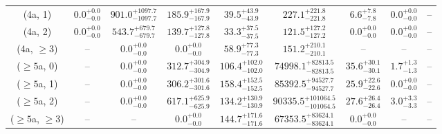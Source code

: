 \begin{table}[h!]
{\begin{tabular}{ccccccccc}
	(4a, 1) & $0.0^{+ 0.0 }_{- 0.0 }$ & $901.0^{+ 1097.7 }_{- 1097.7 }$ & $185.9^{+ 167.9 }_{- 167.9 }$ & $39.5^{+ 43.9 }_{- 43.9 }$ & $227.1^{+ 221.8 }_{- 221.8 }$ & $6.6^{+ 7.8 }_{- 7.8 }$ & $0.0^{+ 0.0 }_{- 0.0 }$ & -- \\[0.5ex] 
	(4a, 2) & $0.0^{+ 0.0 }_{- 0.0 }$ & $543.7^{+ 679.7 }_{- 679.7 }$ & $139.7^{+ 127.8 }_{- 127.8 }$ & $33.3^{+ 37.5 }_{- 37.5 }$ & $121.5^{+ 127.2 }_{- 127.2 }$ & $0.0^{+ 0.0 }_{- 0.0 }$ & $0.0^{+ 0.0 }_{- 0.0 }$ & -- \\[0.5ex] 
	(4a, $\ge3$) & -- & $0.0^{+ 0.0 }_{- 0.0 }$ & $0.0^{+ 0.0 }_{- 0.0 }$ & $58.9^{+ 77.3 }_{- 77.3 }$ & $151.2^{+ 210.1 }_{- 210.1 }$ & -- & -- & -- \\[0.5ex] 
	($\ge5$a, 0) & -- & $0.0^{+ 0.0 }_{- 0.0 }$ & $312.7^{+ 304.9 }_{- 304.9 }$ & $106.4^{+ 102.0 }_{- 102.0 }$ & $74998.1^{+ 82813.5 }_{- 82813.5 }$ & $35.6^{+ 30.1 }_{- 30.1 }$ & $1.7^{+ 1.3 }_{- 1.3 }$ & -- \\[0.5ex] 
	($\ge5$a, 1) & -- & $0.0^{+ 0.0 }_{- 0.0 }$ & $306.2^{+ 301.6 }_{- 301.6 }$ & $158.4^{+ 152.5 }_{- 152.5 }$ & $85392.5^{+ 94527.7 }_{- 94527.7 }$ & $25.9^{+ 22.6 }_{- 22.6 }$ & $0.0^{+ 0.0 }_{- 0.0 }$ & -- \\[0.5ex] 
	($\ge5$a, 2) & -- & $0.0^{+ 0.0 }_{- 0.0 }$ & $617.1^{+ 625.9 }_{- 625.9 }$ & $134.2^{+ 130.9 }_{- 130.9 }$ & $90335.5^{+ 101064.5 }_{- 101064.5 }$ & $27.6^{+ 26.4 }_{- 26.4 }$ & $3.0^{+ 3.3 }_{- 3.3 }$ & -- \\[0.5ex] 
	($\ge5$a, $\ge3$) & -- & -- & $0.0^{+ 0.0 }_{- 0.0 }$ & $144.7^{+ 171.6 }_{- 171.6 }$ & $67353.5^{+ 83624.1 }_{- 83624.1 }$ & $0.0^{+ 0.0 }_{- 0.0 }$ & -- & -- \\[0.5ex] 
	\hline
	\hline
\end{tabular}}
\end{table}
